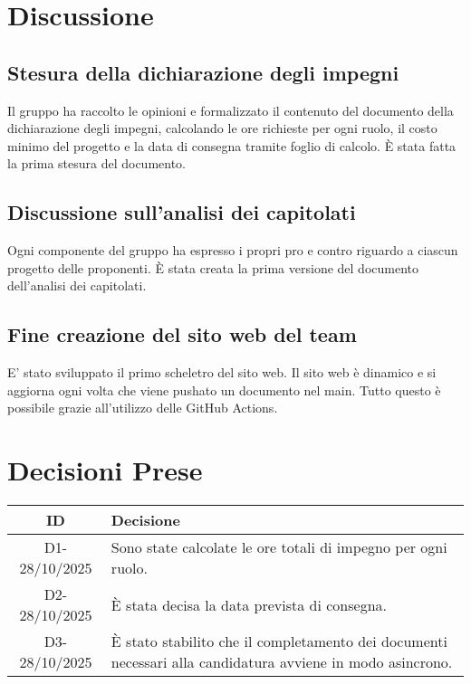 \documentclass[a4paper,12pt]{article}
\begin{document}
\section{Discussione}{
	\subsection{Stesura della dichiarazione degli impegni}{
		Il gruppo ha raccolto le opinioni e formalizzato il contenuto del documento della dichiarazione degli impegni, calcolando le ore richieste per ogni ruolo, il costo minimo del progetto e la data di consegna tramite foglio di calcolo. È stata fatta la prima stesura del documento.
}
	\subsection{Discussione sull'analisi dei capitolati}{
		Ogni componente del gruppo ha espresso i propri pro e contro riguardo a ciascun progetto delle proponenti. È stata creata la prima versione del documento dell'analisi dei capitolati.
}
	\subsection{Fine creazione del sito web del team}{
		E' stato sviluppato il primo scheletro del sito web. Il sito web è dinamico e si aggiorna ogni volta che viene pushato un documento nel main. Tutto questo è possibile grazie all'utilizzo delle GitHub Actions.
}
}


\section{Decisioni Prese}{
    \begin{center}
    \begin{tabular}{|c|p{11cm}|}
        \hline
        \textbf{ID} & \textbf{Decisione} \\
        \hline
            D1-28/10/2025 &  Sono state calcolate le ore totali di impegno per ogni ruolo.\\
        \hline
            D2-28/10/2025 & È stata decisa la data prevista di consegna. \\
		\hline
			D3-28/10/2025 & È stato stabilito che il completamento dei documenti necessari alla candidatura avviene in modo asincrono. \\
		\hline
    \end{tabular}
    \end{center}
}
\end{document}
